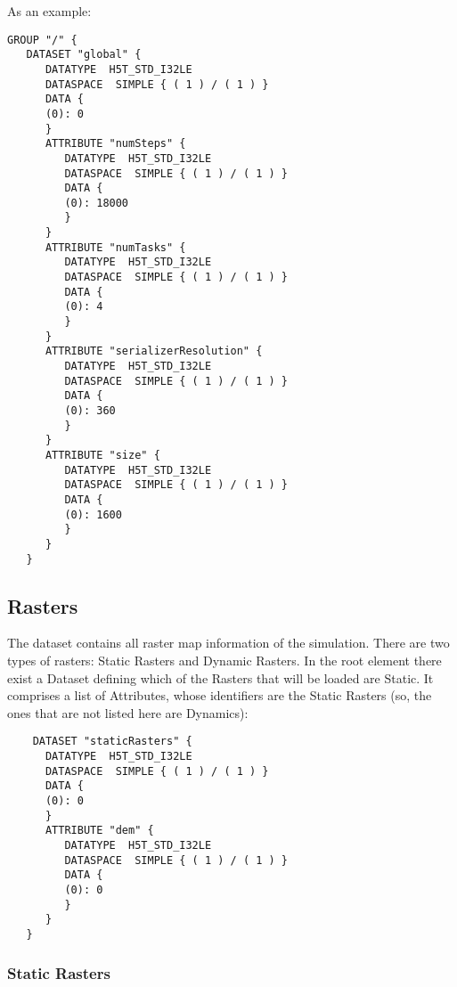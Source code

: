 \documentclass[a4paper,10pt]{article}
\begin{document}
As an example:
\begin{verbatim}
GROUP "/" {
   DATASET "global" {
      DATATYPE  H5T_STD_I32LE
      DATASPACE  SIMPLE { ( 1 ) / ( 1 ) }
      DATA {
      (0): 0
      }
      ATTRIBUTE "numSteps" {
         DATATYPE  H5T_STD_I32LE
         DATASPACE  SIMPLE { ( 1 ) / ( 1 ) }
         DATA {
         (0): 18000
         }
      }
      ATTRIBUTE "numTasks" {
         DATATYPE  H5T_STD_I32LE
         DATASPACE  SIMPLE { ( 1 ) / ( 1 ) }
         DATA {
         (0): 4
         }
      }
      ATTRIBUTE "serializerResolution" {
         DATATYPE  H5T_STD_I32LE
         DATASPACE  SIMPLE { ( 1 ) / ( 1 ) }
         DATA {
         (0): 360
         }
      }
      ATTRIBUTE "size" {
         DATATYPE  H5T_STD_I32LE
         DATASPACE  SIMPLE { ( 1 ) / ( 1 ) }
         DATA {
         (0): 1600
         }
      }
   }
\end{verbatim}

\subsection{Rasters}
The dataset contains all raster map information of the simulation. There are two types of rasters: Static Rasters and Dynamic Rasters. In the root element there exist a Dataset defining which of the Rasters that will be loaded are Static. It comprises a list of Attributes, whose identifiers are the Static Rasters (so, the ones that are not listed here are Dynamics):

\begin{verbatim}
    DATASET "staticRasters" {
      DATATYPE  H5T_STD_I32LE
      DATASPACE  SIMPLE { ( 1 ) / ( 1 ) }
      DATA {
      (0): 0
      }
      ATTRIBUTE "dem" {
         DATATYPE  H5T_STD_I32LE
         DATASPACE  SIMPLE { ( 1 ) / ( 1 ) }
         DATA {
         (0): 0
         }
      }
   }
\end{verbatim}


\subsubsection{Static Rasters}
\end{document}
